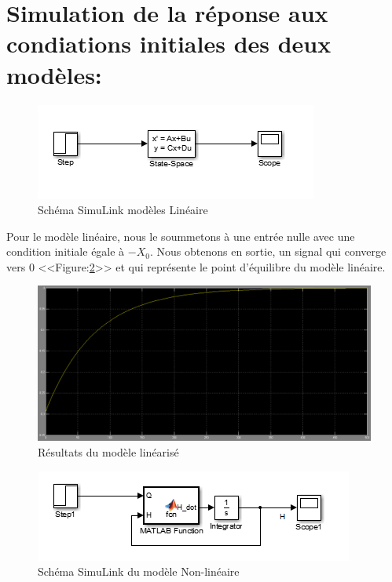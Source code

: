 	
\section{Simulation de la réponse aux condiations initiales des deux modèles:}


\begin{figure}[H]
    \centering
    \includegraphics[width=\textwidth]{slinear.PNG}
    \caption{Schéma SimuLink modèles Linéaire }
    \label{fig:Part1}
\end{figure}

Pour le modèle linéaire, nous le soummetons à une entrée nulle avec une condition initiale égale à $-X_0$. Nous obtenons en sortie, un signal qui converge vers $0$ <<Figure:\ref{fig:linéar}>> et qui représente le point d'équilibre du modèle linéaire.  


\begin{figure}[H]
    \centering
    \includegraphics[width=\textwidth]{linear.PNG}
    \caption{Résultats du modèle linéarisé }
    \label{fig:linéar}
\end{figure}


\begin{figure}[H]
    \centering
    \includegraphics[width=\textwidth]{snonlinear.PNG}
    \caption{Schéma SimuLink du modèle Non-linéaire }
    \label{fig:snonlinéar}
\end{figure}

